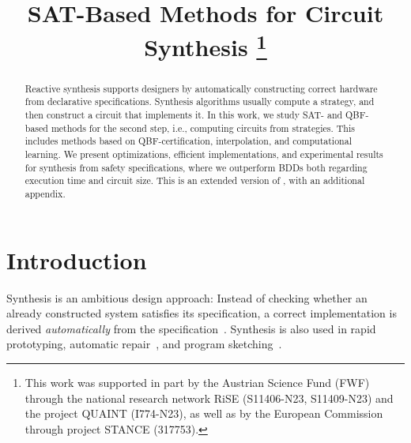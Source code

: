 \documentclass[conference]{IEEEtran}
\begin{document}
\title{SAT-Based Methods for Circuit Synthesis
\thanks{This work was
supported in part by the Austrian Science Fund (FWF) through the
national research network RiSE (S11406-N23, S11409-N23) and the project QUAINT
(I774-N23), as well as by the European Commission through project
STANCE (317753).}}

\author{
\vspace{0.2cm}
}

\maketitle

\begin{abstract}
Reactive synthesis supports designers by automatically constructing correct 
hardware from declarative specifications.  Synthesis algorithms usually compute 
a strategy, and then construct a circuit that implements it. In this work, we 
study SAT- and QBF-based methods for the second step, i.e., computing circuits 
from strategies. This includes methods based on QBF-certification, 
interpolation, and computational learning. We present optimizations, efficient 
implementations, and experimental results for synthesis from safety 
specifications, where we outperform BDDs both regarding execution time and 
circuit size.
This is an extended version of \cite{fmcad14}, with an
additional appendix.
\end{abstract}

\IEEEpeerreviewmaketitle

\section{Introduction} \label{sec:intro}
Synthesis is an ambitious design approach:  Instead of checking whether an 
already constructed system satisfies its specification, a correct implementation 
is derived \emph{automatically} from the specification~\cite{BloemGJPPW07}.  
Synthesis is also used in rapid prototyping, automatic 
repair~\cite{JobstmannSGB12}, and program sketching~\cite{Solar-Lezama09}.
\end{document}
